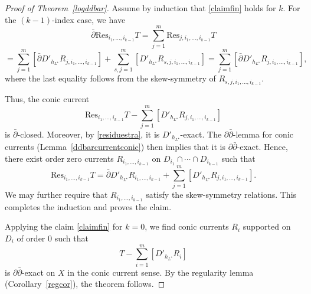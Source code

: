 \documentclass[english]{amsart}
\newcommand{\ddbar}{\partial\bar{\partial}}
\newcommand{\Res}{\mathrm{Res}}
\newcommand{\dbar}{\bar \partial}
\numberwithin{equation}{thm}
\begin{document}
\begin{proof}[Proof of Theorem~\ref{logddbar}]
		\medskip
		
		Assume by induction that \eqref{claimfin} holds for $k$. For the $(k-1)$-index case, we have
		\[
		\dbar \Res_{i_1,\dots,i_{k-1}} T
		= \sum_{j=1}^m \Res_{j,i_1,\dots,i_{k-1}} T
		\]
		\[
		= \sum_{j=1}^m [\dbar D'_{h_{L^\star}} R_{j,i_1,\dots,i_{k-1}}]
		+ \sum_{s,j=1}^m [D'_{h_{L^\star}} R_{s,j,i_1,\dots,i_{k-1}}]
		= \sum_{j=1}^m [\dbar D'_{h_{L^\star}} R_{j,i_1,\dots,i_{k-1}}],
		\]
		where the last equality follows from the skew-symmetry of $R_{s,j,i_1,\dots,i_{k-1}}$.
		
		Thus, the conic current
		\[
		\Res_{i_1,\dots,i_{k-1}} T
		- \sum_{j=1}^m [D'_{h_{L^\star}} R_{j,i_1,\dots,i_{k-1}}]
		\]
		is $\dbar$-closed. Moreover, by \eqref{residuestra}, it is $D'_{h_{L^\star}}$-exact.
		The $\ddbar$-lemma for conic currents (Lemma~\ref{ddbarcurrentconic}) then implies that it is $\ddbar$-exact.
		Hence, there exist order zero currents $R_{i_1,\dots,i_{k-1}}$ on $D_{i_1}\cap\cdots\cap D_{i_{k-1}}$ such that
		\[
		\Res_{i_1,\dots,i_{k-1}} T
		= \dbar D'_{h_{L^\star}} R_{i_1,\dots,i_{k-1}}
		+ \sum_{j=1}^m [D'_{h_{L^\star}} R_{j,i_1,\dots,i_{k-1}}].
		\]
		We may further require that $R_{i_1,\dots,i_{k-1}}$ satisfy the skew-symmetry relations.
		This completes the induction and proves the claim.
		
		\medskip
		
		Applying the claim \eqref{claimfin} for $k=0$, we find conic currents $R_i$ supported on $D_i$ of order $0$ such that
		\[
		T - \sum_{i=1}^m [D'_{h_{L^\star}} R_i]
		\]
		is $\ddbar$-exact on $X$ in the conic current sense.
		By the regularity lemma (Corollary~\ref{regcor}), the theorem follows.
	\end{proof}
	
\end{document}
